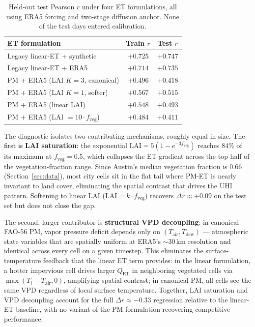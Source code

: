 \documentclass[12pt, letterpaper]{article}
\begin{document}
\begin{table}[ht]
  \centering
  \caption{Held-out test Pearson $r$ under four ET formulations, all using
  ERA5 forcing and two-stage diffusion anchor. None of the test days entered
  calibration.}
  \label{tab:pm_diagnostic}
  \begin{tabular}{lcc}
    \toprule
    ET formulation & Train $r$ & Test $r$ \\
    \midrule
    Legacy linear-ET + synthetic  & $+0.725$ & $+0.747$ \\
    Legacy linear-ET + ERA5       & $+0.714$ & $+0.735$ \\
    PM + ERA5 (LAI $K=3$, canonical) & $+0.496$ & $+0.418$ \\
    PM + ERA5 (LAI $K=1$, softer)    & $+0.567$ & $+0.515$ \\
    PM + ERA5 (linear LAI)           & $+0.548$ & $+0.493$ \\
    PM + ERA5 (LAI $= 10 \cdot f_{\mathrm{veg}}$) & $+0.484$ & $+0.411$ \\
    \bottomrule
  \end{tabular}
\end{table}

The diagnostic isolates two contributing mechanisms, roughly equal in size.
The first is \textbf{LAI saturation}: the exponential
$\mathrm{LAI} = 5(1 - e^{-3 f_{\mathrm{veg}}})$ reaches 84\% of its
maximum at $f_{\mathrm{veg}} = 0.5$, which collapses the ET gradient
across the top half of the vegetation-fraction range. Since Austin's
median vegetation fraction is 0.66 (Section~\ref{sec:data}), most city
cells sit in the flat tail where PM-ET is nearly invariant to land cover,
eliminating the spatial contrast that drives the UHI pattern. Softening to
linear LAI ($\mathrm{LAI} = k \cdot f_{\mathrm{veg}}$) recovers $\Delta r
\approx +0.09$ on the test set but does not close the gap.

The second, larger contributor is \textbf{structural VPD decoupling}:
in canonical FAO-56 PM, vapor pressure deficit depends only on
$(T_{\mathrm{air}}, T_{\mathrm{dew}})$ — atmospheric state variables
that are spatially uniform at ERA5's $\sim$30\,km resolution and identical
across every cell on a given timestep. This eliminates the surface-temperature
feedback that the linear ET term provides: in the linear formulation,
a hotter impervious cell drives larger $Q_{\mathrm{ET}}$ in neighboring
vegetated cells via $\max(T_i - T_{\mathrm{air}}, 0)$, amplifying spatial
contrast; in canonical PM, all cells see the same VPD regardless of local
surface temperature. Together, LAI saturation and VPD decoupling account
for the full $\Delta r \approx -0.33$ regression relative to the linear-ET
baseline, with no variant of the PM formulation recovering competitive
performance.
\end{document}
